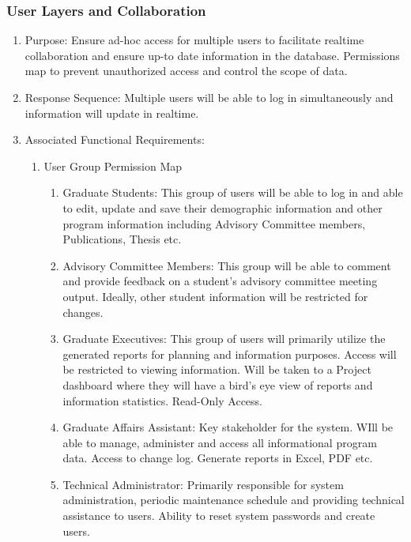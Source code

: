 \documentclass{journal}
\begin{document}
				\subsubsection{User Layers and Collaboration}
				\begin{enumerate}
				\item Purpose: Ensure ad-hoc access for multiple users to facilitate realtime collaboration and ensure up-to date information in the database. Permissions map to prevent unauthorized access and control the scope of data.
				\item Response Sequence: Multiple users will be able to log in simultaneously and information will update in realtime.
				\item Associated Functional Requirements:
				\begin{enumerate}
				\item User Group Permission Map
				\begin{enumerate}
				\item Graduate Students: This group of users will be able to log in and able to edit, update and save their demographic information and other program information including Advisory Committee members, Publications, Thesis etc.
				\item Advisory Committee Members: This group will be able to comment  and provide feedback on a student's advisory committee meeting output. Ideally, other student information will be restricted for changes.
				\item Graduate Executives: This group of users will primarily utilize the generated reports for planning and information purposes. Access will be restricted to viewing information. Will be taken to a Project dashboard where they will have a bird's eye view of reports and information statistics. Read-Only Access.
				\item Graduate Affairs Assistant: Key stakeholder for the system. WIll be able to manage, administer and access all informational program data. Access to change log. Generate reports in Excel, PDF etc.
				\item Technical Administrator: Primarily responsible for system administration, periodic maintenance schedule and providing technical assistance to users. Ability to reset system passwords and create users.
				\end{enumerate}
				\end{enumerate}
				\end{enumerate}
\end{document}
